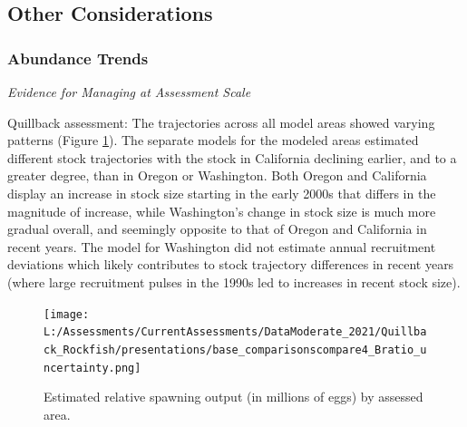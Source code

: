 \documentclass[11pt,
  english,
  letterpaper,
]{article}
\begin{document}
\leavevmode\tagmcend\tagstructend\par


\hypertarget{other-considerations}{%
\subsection{Other Considerations}\label{other-considerations}}

\leavevmode\tagmcend\tagstructend


\hypertarget{abundance-trends}{%
\subsubsection{Abundance Trends}\label{abundance-trends}}

\leavevmode\tagmcend\tagstructend


\emph{Evidence for Managing at Assessment Scale}

\leavevmode\tagmcend\tagstructend\par


Quillback assessment: The trajectories across all model areas showed varying patterns (Figure \ref{fig:relb-comparison}). The separate models for the modeled areas estimated different stock trajectories with the stock in California declining earlier, and to a greater degree, than in Oregon or Washington. Both Oregon and California display an increase in stock size starting in the early 2000s that differs in the magnitude of increase, while Washington's change in stock size is much more gradual overall, and seemingly opposite to that of Oregon and California in recent years. The model for Washington did not estimate annual recruitment deviations which likely contributes to stock trajectory differences in recent years (where large recruitment pulses in the 1990s led to increases in recent stock size).

\leavevmode\tagmcend\tagstructend\par


\begin{figure}
\centering
\texttt{[image: L:/Assessments/CurrentAssessments/DataModerate\_2021/Quillback\_Rockfish/presentations/base\_comparisonscompare4\_Bratio\_uncertainty.png]}
\caption{Estimated relative spawning output (in millions of eggs) by assessed area.\label{fig:relb-comparison}}
\end{figure}
\end{document}
